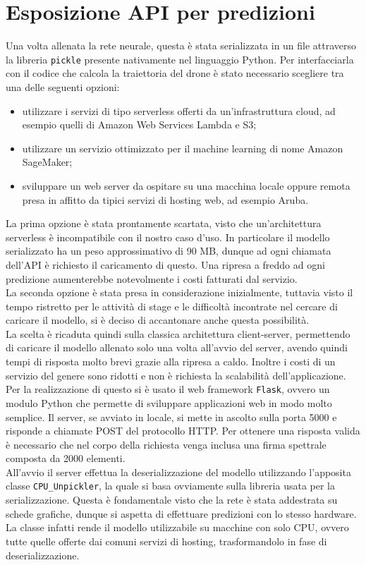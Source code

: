 \section{Esposizione API per predizioni}
Una volta allenata la rete neurale, questa è stata serializzata in un file attraverso la libreria \verb|pickle| presente nativamente nel linguaggio Python. Per interfacciarla con il codice che calcola la traiettoria del drone è stato necessario scegliere tra una delle seguenti opzioni:
\begin{itemize}
    \item utilizzare i servizi di tipo serverless offerti da un'infrastruttura cloud, ad esempio quelli di Amazon Web Services Lambda e S3;
    \item utilizzare un servizio ottimizzato per il machine learning di nome Amazon SageMaker;
    \item sviluppare un web server da ospitare su una macchina locale oppure remota presa in affitto da tipici servizi di hosting web, ad esempio Aruba.
\end{itemize}
La prima opzione è stata prontamente scartata, visto che un'architettura serverless è incompatibile con il nostro caso d'uso. In particolare il modello serializzato ha un peso approssimativo di 90 MB, dunque ad ogni chiamata dell'API è richiesto il caricamento di questo. Una ripresa a freddo ad ogni predizione aumenterebbe notevolmente i costi fatturati dal servizio.\\
La seconda opzione è stata presa in considerazione inizialmente, tuttavia visto il tempo ristretto per le attività di stage e le difficoltà incontrate nel cercare di caricare il modello, si è deciso di accantonare anche questa possibilità.\\
La scelta è ricaduta quindi sulla classica architettura client-server, permettendo di caricare il modello allenato solo una volta all'avvio del server, avendo quindi tempi di risposta molto brevi grazie alla ripresa a caldo. Inoltre i costi di un servizio del genere sono ridotti e non è richiesta la scalabilità dell'applicazione.\\
Per la realizzazione di questo si è usato il web framework \verb|Flask|, ovvero un modulo Python che permette di sviluppare applicazioni web in modo molto semplice. Il server, se avviato in locale, si mette in ascolto sulla porta 5000 e risponde a chiamate POST del protocollo HTTP. Per ottenere una risposta valida è necessario che nel corpo della richiesta venga inclusa una firma spettrale composta da 2000 elementi.\\
All'avvio il server effettua la deserializzazione del modello utilizzando l'apposita classe \verb|CPU_Unpickler|, la quale si basa ovviamente sulla libreria usata per la serializzazione. Questa è fondamentale visto che la rete è stata addestrata su schede grafiche, dunque si aspetta di effettuare predizioni con lo stesso hardware. La classe infatti rende il modello utilizzabile su macchine con solo CPU, ovvero tutte quelle offerte dai comuni servizi di hosting, trasformandolo in fase di deserializzazione.